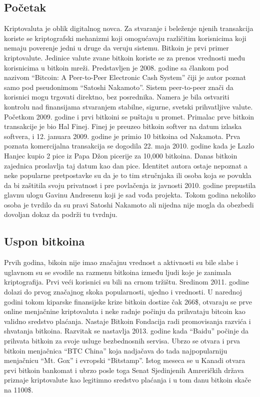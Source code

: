 \documentclass[a4paper]{article}
\begin{document}
\subsection{Početak}
Kriptovaluta je oblik digitalnog novca. Za stvaranje i beleženje njenih transakcija koriste se kriptografski mehanizmi koji omogućavaju različitim korisnicima koji nemaju poverenje jedni u druge da veruju sistemu. Bitkoin je prvi primer kriptovalute. Jedinice valute zvane bitkoin koriste  se za prenos vrednosti među korisnicima u bitkoin mreži. Predstavljen je 2008. godine sa člankom pod nazivom ``Bitcoin: A Peer-to-Peer Electronic Cash System'' čiji je autor poznat samo pod pseudonimom  ``Satoshi Nakamoto''. Sistem peer-to-peer znači da korisnici mogu trgovati direktno, bez posrednika. Namera je bila ostvariti kontrolu nad finansijama stvaranjem stabilne, sigurne, svetski prihvatljive valute. 
Početkom 2009. godine i prvi bitkoini se puštaju u promet. Primalac prve bitkoin transakcije je bio Hal Finej. Finej je preuzeo bitkoin softver na datum izlaska softvera, i 12. januara 2009. godine je primio 10 bitkoina od Nakamota. Prva poznata komercijalna transakcija se dogodila 22. maja 2010. godine kada je Lazlo Hanjec kupio 2 pice iz Papa Džon picerije za 10,000 bitkoina. Danas bitkoin zajednica proslavlja taj datum kao dan pice. 
Identitet autora ostaje nepoznat a neke popularne pretpostavke su da je to tim stručnjaka  ili osoba koja se povukla da bi zaštitila svoju privatnost i pre povlačenja iz javnosti 2010. godine prepustila glavnu ulogu Gavinu Andresenu koji je sad vođa projekta. Tokom godina nekoliko osoba je tvrdilo da su pravi Satoshi Nakamoto ali nijedna nije mogla da obezbedi dovoljan dokaz da podrži tu tvrdnju.

\subsection{Uspon bitkoina}
Prvih godina, bikoin nije imao značajnu vrednost a aktivnosti su bile slabe i uglavnom su se svodile na razmenu bitkoina između ljudi koje je zanimala kriptografija. Prvi veći korisnici su bili na crnom tržištu. Sredinom 2011. godine dolazi do prvog značajnog skoka popularnosti, ujedno i vrednosti. U narednoj godini tokom kiparske finansijske krize bitkoin dostize čak 266\$, otvaraju se prve online menjačnine kriptovaluta i neke radnje počinju da prihvataju bitcoin kao validno sredstvo plaćanja. Nastaje Bitkoin Fondacija radi promovisanja razvića i shvatanja bitkoina. Razvitak se nastavlja 2013. godine kada ``Baidu'' počinje da prihvata bitkoin za svoje usluge bezbednosnih servisa. Ubrzo se otvara i prva bitkoin menjačnica ``BTC China'' koja nadjačava do tada najpopularniju menjačnicu ``Mt. Gox'' i evropski ``Bitstamp''. Istog meseca se u Kanadi otvara prvi bitkoin bankomat i ubrzo posle toga Senat Sjedinjenih Amreričkih država priznaje kriptovalute kao legitimno sredstvo plaćanja i u tom danu bitkoin skače na 1100\$.
\end{document}
